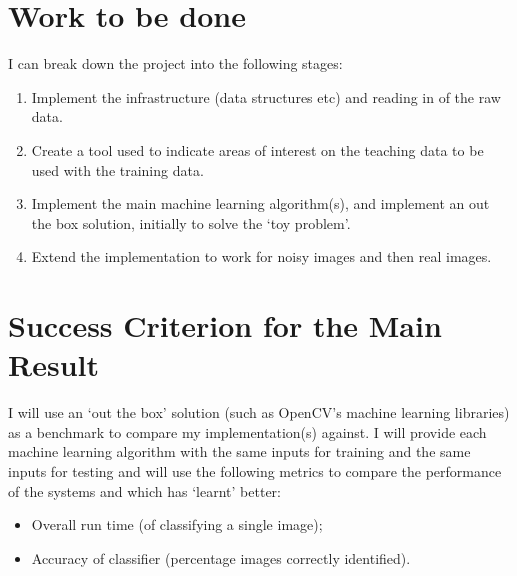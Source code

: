 \documentclass[12pt,a4paper,twoside]{article}
\begin{document}

\section*{Work to be done}

I can break down the project into the following stages:

\begin{enumerate}

\item 
Implement the infrastructure (data structures etc) and reading in of the raw
data.

\item 
Create a tool used to indicate areas of interest on the teaching data to be used 
with the training data.

\item 
Implement the main machine learning algorithm(s), and implement an out the 
box solution, initially to solve the `toy problem'. 

\item 
Extend the implementation to work for noisy images and then real images.

\end{enumerate}




\section*{Success Criterion for the Main Result}

I will use an `out the box' solution (such as OpenCV's machine learning 
libraries) as a benchmark to compare my implementation(s) against. I 
will provide each machine learning algorithm with the same inputs for training 
and the same inputs for testing and will use the following metrics to compare 
the performance of the systems and which has `learnt' better:
\begin{itemize}
    \item Overall run time (of classifying a single image);
    \item Accuracy of classifier (percentage images correctly identified).
\end{itemize}



\end{document}
